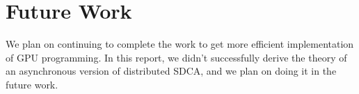 \documentclass{article}
\begin{document}
\section{Future Work}
We plan on continuing to complete the work to get more efficient implementation
of GPU programming. In this report, we didn't successfully derive the theory of
an asynchronous version of distributed SDCA, and we plan on doing it in the
future work. 




\end{document}

